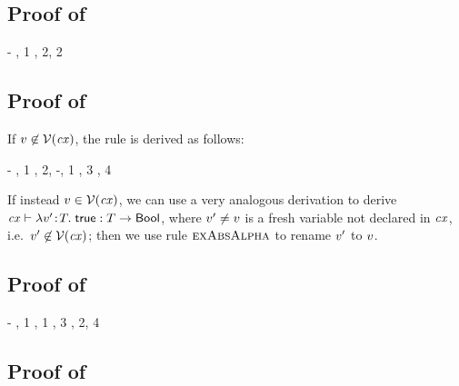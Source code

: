 \subsection*{Proof of }

\begin{derivation}
\step{\cxwfO}
     {\hyp}
\step{\hastyO{\abs{\varfx}{\bool}{\varfx}}{\tarr{\bool}{\bool}}}
     {\Reidbool, 1}
\step{\hastyO{(\eq{\abs{\varfx}{\bool}{\varfx}}{\abs{\varfx}{\bool}{\varfx}})}
             {\bool}}
     {\Reeq, 2, 2}
\end{derivation}



\subsection*{Proof of }

If $v\not\in\mathcal{V}(\mathit{cx})$, the rule is derived as follows:
\begin{derivation}
\step{\istyO{\typ}}
     {\hyp}
\step{\cxwfO}
     {, 1}
\step{\cxwf{\snoc{\cx}{\vdec{\var}{\typ}}}}
     {\Rcxvdec, 2, \hyp, 1}
\step{\hasty{\snoc{\cx}{\vdec{\var}{\typ}}}{\true}{\bool}}
     {\Retrue, 3}
\step{\hastyO{\abs{\var}{\typ}{\true}}{\tarr{\typ}{\bool}}}
     {\Reabs, 4}
\end{derivation}
If instead $v\in\mathcal{V}(\mathit{cx})$, we can use a very analogous derivation to
derive $\mathit{cx}\vdash\lambda v'\!:\!T.\;\mathsf{true}:T\to\mathsf{Bool}$, where
$v'\neq v$ is a fresh variable not declared in $\mathit{cx}$, i.e.\
$v'\not\in\mathcal{V}(\mathit{cx})$; then we use rule $\textsc{exAbsAlpha}$ to rename $v'$ to
$v$.



\subsection*{Proof of }

\begin{derivation}
\step{\cxwfO}
     {\hyp}
\step{\hastyO{\abs{\varfx}{\bool}{\varfx}}{\tarr{\bool}{\bool}}}
     {\Reidbool, 1}
\step{\istyO{\bool}}
     {\Rtbool, 1}
\step{\hastyO{\abs{\varfx}{\bool}{\true}}{\tarr{\bool}{\bool}}}
     {\Reconsttrue, 3}
\step{\hastyO{(\eq{\abs{\varfx}{\bool}{\varfx}}{\abs{\varfx}{\bool}{\true}})}
             {\bool}}
     {\Reeq, 2, 4}
\end{derivation}



\subsection*{Proof of }

